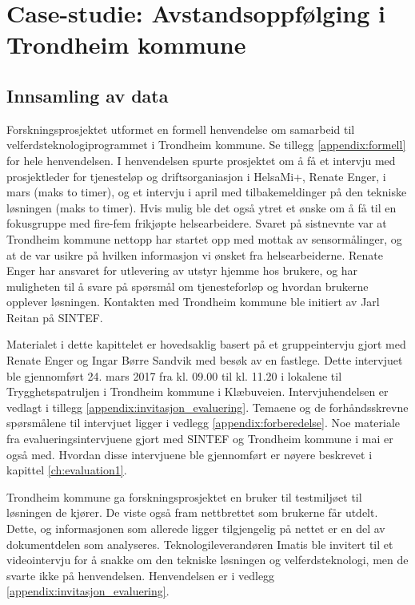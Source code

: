 \chapter{Case-studie: Avstandsoppfølging i Trondheim kommune}
\label{ch:case}

\section{Innsamling av data}
\label{sec:innsamling}
Forskningsprosjektet utformet en formell henvendelse om samarbeid til velferdsteknologiprogrammet i Trondheim kommune.
Se tillegg \ref{appendix:formell} for hele henvendelsen. I henvendelsen spurte prosjektet om å få et intervju med
prosjektleder for tjenesteløp og driftsorganiasjon i HelsaMi+, Renate Enger, i mars
(maks to timer), og et intervju i april med tilbakemeldinger på den tekniske løsningen (maks to timer). Hvis mulig ble det også
ytret et ønske om å få til en fokusgruppe med fire-fem frikjøpte helsearbeidere. Svaret på sistnevnte var at Trondheim kommune
nettopp har startet opp med mottak av sensormålinger, og at de var usikre på hvilken informasjon vi ønsket fra helsearbeiderne.
Renate Enger har ansvaret for utlevering av utstyr hjemme hos brukere, og har muligheten til å svare på spørsmål om tjenesteforløp
og hvordan brukerne opplever løsningen. Kontakten med Trondheim kommune ble initiert av Jarl Reitan på SINTEF.

Materialet i dette kapittelet er hovedsaklig basert på et gruppeintervju gjort med Renate Enger og Ingar Børre Sandvik med besøk
av en fastlege. Dette intervjuet ble gjennomført 24. mars 2017 fra kl. 09.00 til kl. 11.20 i lokalene til Trygghetspatruljen i
Trondheim kommune i Klæbuveien. Intervjuhendelsen er vedlagt i tillegg \ref{appendix:invitasjon_evaluering}. Temaene og
de forhåndsskrevne spørsmålene til intervjuet ligger i vedlegg \ref{appendix:forberedelse}.
Noe materiale fra evalueringsintervjuene gjort med SINTEF og Trondheim kommune i mai er
også med. Hvordan disse intervjuene ble gjennomført er nøyere beskrevet i kapittel \ref{ch:evaluation1}.

Trondheim kommune ga forskningsprosjektet en bruker til testmiljøet til løsningen de kjører. De viste også fram
nettbrettet som brukerne får utdelt. Dette, og informasjonen som allerede ligger tilgjengelig på nettet er en del
av dokumentdelen som analyseres. Teknologileverandøren Imatis ble invitert til et videointervju for å snakke om den tekniske
løsningen og velferdsteknologi, men de svarte ikke på henvendelsen. Henvendelsen er i vedlegg \ref{appendix:invitasjon_evaluering}.

